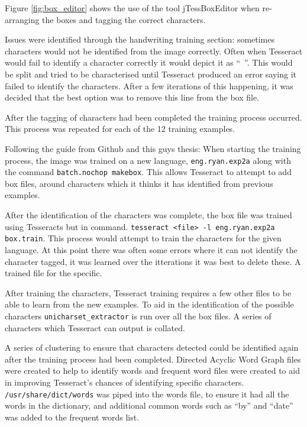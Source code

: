 Figure \ref{fig:box_editor} shows the use of the tool jTessBoxEditor \cite{citeulike:13926798} when re-arranging the boxes and tagging the correct characters.

Issues were identified through the handwriting training section: sometimes characters would not be identified from the image correctly. Often when Tesseract would fail to identify a character correctly it would depict it as ``~''. This would be split and tried to be characterised until Tesseract produced an error saying it failed to identify the characters. After a few iterations of this happening, it was decided that the best option was to remove this line from the box file.

After the tagging of characters had been completed the training process occurred. This process was repeated for each of the 12 training examples.

Following the guide from Github and this guys thesis:
When starting the training process, the image was trained on a new language, \texttt{eng.ryan.exp2a} along with the command \texttt{batch.nochop makebox}. This allows Tesseract to attempt to add box files, around characters which it thinks it has identified from previous examples.

After the identification of the characters was complete, the box file was trained using Tesseracts but in command. \texttt{tesseract <file> -l eng.ryan.exp2a box.train}. This process would attempt to train the characters for the given language. At this point there was often some errors where it can not identify the character tagged, it was learned over the itterations it was best to delete these. A trained file for the specific.

After training the characters, Tesseract training requires a few other files to be able to learn from the new examples. To aid in the identification of the possible characters \texttt{unicharset\_extractor} is run over all the box files. A series of characters which Tesseract can output is collated.

A series of clustering to ensure that characters detected could be identified again after the training process had been completed. Directed Acyclic Word Graph files were created to help to identify words and frequent word files were created to aid in improving Tesseract's chances of identifying specific characters. \texttt{/usr/share/dict/words} was piped into the words file, to ensure it had all the words in the dictionary, and additional common words such as ``by'' and ``date'' was added to the frequent words list.

